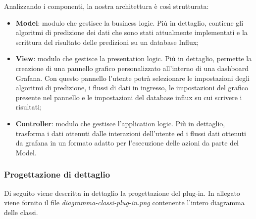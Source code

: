 Analizzando i componenti, la nostra architettura è così strutturata: 
\begin{itemize}
	\item \textbf{Model}: modulo che gestisce la business logic\glo. Più in dettaglio, contiene gli algoritmi di predizione dei dati che sono stati attualmente implementati e la scrittura del risultato delle predizioni su un database Influx;
	\item \textbf{View}: modulo che gestisce la presentation logic. Più in dettaglio, permette la creazione di una pannello grafico personalizzato all'interno di una dashboard Grafana\glosp. Con questo pannello l'utente potrà selezionare le impostazioni degli algoritmi di predizione, i flussi di dati in ingresso, le impostazioni del grafico presente nel pannello e le impostazioni del database influx su cui scrivere i risultati;
	\item \textbf{Controller}: modulo che gestisce l'application logic. Più in dettaglio, trasforma i dati ottenuti dalle interazioni dell'utente ed i flussi dati ottenuti da grafana in un formato adatto per l'esecuzione delle azioni da parte del Model.
\end{itemize}
\subsubsection{Progettazione di dettaglio}
Di seguito viene descritta in dettaglio la progettazione del plug-in. In allegato viene fornito il file \textit{diagramma-classi-plug-in.png} contenente l'intero diagramma delle classi.
